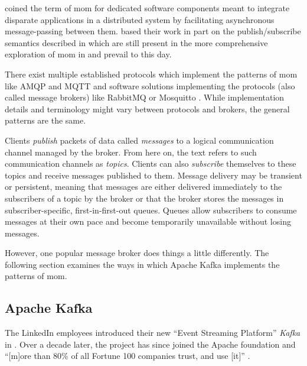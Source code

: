 \cite{banavar_case_1999} coined the term of \acrlong{mom} for dedicated software components meant to integrate disparate applications in a distributed system by facilitating asynchronous message-passing between them.
\citeauthor{banavar_case_1999} based their work in part on the publish/subscribe semantics described in \cite{oki_information_1993} which are still present in the more comprehensive exploration of \gls{mom} in \cite{curry_message-oriented_2004} and prevail to this day.

There exist multiple established protocols which implement the patterns of \gls{mom} like AMQP and MQTT \parencites{amqp}{mqtt} and software solutions implementing the protocols (also called message brokers) like RabbitMQ or Mosquitto \parencites{rabbitmq}{mosquitto}.
While implementation details and terminology might vary between protocols and brokers, the general patterns are the same.

Clients \emph{publish} packets of data called \emph{messages} to a logical communication channel managed by the broker.
From here on, the text refers to such communication channels as \emph{topics}.
Clients can also \emph{subscribe} themselves to these topics and receive messages published to them.
Message delivery may be transient or persistent, meaning that messages are either delivered immediately to the subscribers of a topic by the broker or that the broker stores the messages in subscriber-specific, first-in-first-out queues.
Queues allow subscribers to consume messages at their own pace and become temporarily unavailable without losing messages.
\parencite{curry_message-oriented_2004}

However, one popular message broker does things a little differently.
The following section examines the ways in which Apache Kafka implements the patterns of \gls{mom}.

\subsection{Apache Kafka}

The LinkedIn employees \citeauthor{kreps_kafka_2011} introduced their new \enquote{Event Streaming Platform} \emph{Kafka} in \citeyear{kreps_kafka_2011} \parencite{kreps_kafka_2011}.
Over a decade later, the project has since joined the Apache foundation and \enquote{[m]ore than 80\% of all Fortune 100 companies trust, and use [it]} \parencite{apache_software_foundation_apache_nodate}.

